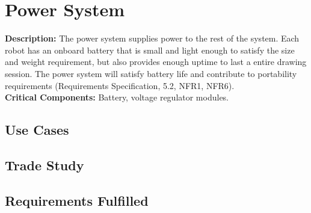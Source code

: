 
\section{Power System}
\label{sec:power_system}
\textbf{Description:} The power system supplies power to the rest of the system. Each robot has an onboard battery that is small and light enough to satisfy the size and weight requirement, but also provides enough uptime to last a entire drawing session. The power system will satisfy battery life and contribute to portability requirements (Requirements Specification, 5.2, NFR1, NFR6). \\
\textbf{Critical Components:} Battery, voltage regulator modules. \\

\subsection{Use Cases}

\subsection{Trade Study}

\subsection{Requirements Fulfilled}